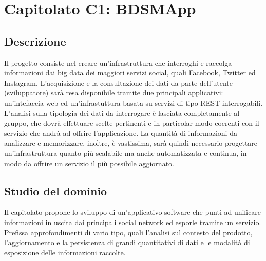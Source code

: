 %


\section{Capitolato C1: BDSMApp}

\subsection{Descrizione}
Il progetto consiste nel creare un'infrastruttura che interroghi e raccolga informazioni dai big data dei maggiori servizi social, quali Facebook, Twitter ed Instagram. L'acquisizione e la consultazione dei dati da parte dell'utente (sviluppatore) sarà resa disponibile tramite due principali applicativi: un'intefaccia web ed un'infrastuttura basata su servizi di tipo REST interrogabili. L'analisi sulla tipologia dei dati da interrogare è lasciata completamente al gruppo, che dovrà effettuare scelte pertinenti e  in particolar modo coerenti con il servizio che andrà ad offrire l'applicazione. La quantità di informazioni da analizzare e memorizzare, inoltre, è vastissima, sarà quindi necessario progettare un'infrastruttura quanto più scalabile ma anche automatizzata e continua, in modo da offrire un servizio il più possibile aggiornato.

\subsection{Studio del dominio}
Il capitolato propone lo sviluppo di un'applicativo software che punti ad unificare informazioni in uscita dai principali social network ed esporle tramite un servizio. Prefissa approfondimenti di vario tipo, quali l'analisi sul contesto del prodotto, l'aggiornamento e la persistenza di grandi quantitativi di dati e le modalità di esposizione delle informazioni raccolte.
